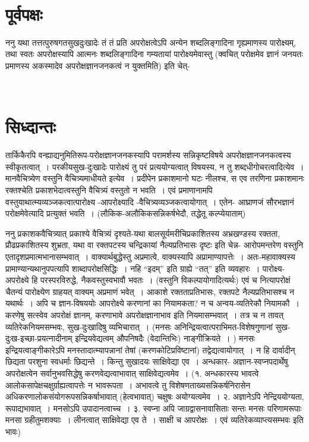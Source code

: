 {~\\[-1.7cm]

\section*{पूर्वपक्षः}
\vskip -3pt

ननु  यथा तत्तत्पुरुषगतसुखदुःखादेः तं तं प्रति अपरोक्षत्वेऽपि अन्येन शब्दलिङ्गादिना गृह्यमाणस्य पारोक्ष्यम्, तथा स्वतः अपरोक्षस्यापि आत्मनः शब्दलिङ्गादिना गम्यतायां पारोक्ष्यमेवास्तु (क्वचित् परोक्षमेव ज्ञानं जनयतः प्रमाणस्य अकस्मादेव अपरोक्षज्ञानजनकत्वं न युक्तमिति) इति चेत्-

~\\[-1.7cm]

\section*{सिध्दान्तः}
तार्किकैरपि वन्ह्याद्यनुमितिरूप-परोक्षज्ञानजनकस्यापि परामर्शस्य सन्निकृष्टविषये अपरोक्षज्ञानजनकत्वस्य स्वीकृतत्वात्~। परकीयसुख-दुःखादेः पारोक्ष्यं तु परं प्रत्ययोग्यत्वात् विषयस्य, न तु शब्दधीगोचरत्वादित्येव~। मानवैचित्र्येण वस्तुनि वैचित्र्यमाधीयते इत्येव~। प्रदीपेन प्रकाशमानो घटः नीलश्च, स एव तरणिना प्रकाशमानः रक्तश्चेति प्रकाशभेदात्वस्तुनि वैचित्र्यं वस्तुतो न भवति~। एवं प्रमाणानामपि वस्तुयाथात्म्यव्यञ्जकत्वा\-त्पारोक्ष्य -आपरोक्ष्यादि -वैचित्र्यव्यञ्जकत्वायोगात्~। एतेन- आघ्राणजं सौरभज्ञानं परोक्षमेवेत्यादि प्रत्युक्तं भवति~। (लौकिक-अलौकिकसन्निकर्षभेदौ, तद्धेतू कल्प्येयाताम्)

ननु प्रकाशकवैचित्र्यात् प्रकाश्ये वैचित्र्यं दृश्यते-यथा बालसूर्यमरीचिप्रकाशितस्य अभ्रखण्डस्य रक्तता, प्रौढप्रकाशितस्य शुभ्रता, यथा वा रक्तपटस्य चन्द्रिकायां नैल्यप्रतिभासः दृष्टः इति चेन्न- आरोपमन्तरेण वस्तुनि एतादृशप्रमात्मभानासम्भवात्~। वाक्यार्थबुद्धेस्तु अप्रमात्वे, वाक्यस्यापि अप्रामाण्यापत्तेः~। अतः-महावाक्यस्य प्रामाण्यान्यथानुपपत्यापि शाब्दापरोक्षसिद्धिः~। नहि “इदम्” इति ग्राह्ये “तत्” इति व्यवहारः~। पारोक्ष्य-अपरोक्ष्ये हि परस्परविरुद्धे, नैकवस्तुस्वभावौ भवतः~। (वस्तुनि विकल्पायोगादित्यर्थः) एवं च नित्यापरोक्षं चैतन्यं पारोक्ष्येण ग्राहयत् वाक्यम् अप्रमाणं भवेत्~। आकाशे रक्तताप्रतिभासः, रक्तपटे नैल्यप्रतिभासश्च न यथार्थः~। अपि च ज्ञान-विषययोः आपरोक्ष्ये करणानां का नियामकता? न च अन्वय-व्यतिरेकौ नियामकौ~। करणेषु सत्स्वेव अपरोक्षं ज्ञानम्, करणाभावे अपरोक्षज्ञानाभाव इति नियमासम्भवात्~। तत्र च न तावत् व्यतिरेकनियमसम्भवः, सुख-दुःखादिषु व्यभिचारात्~। (मनसः अनिन्द्रियत्वात्पराभिमत-विशेषगुणानां सुख-दुःख-इच्छा-प्रयत्नादीनाम् इन्द्रियवेद्यत्वम् औपनिषदैः (वेदान्तिभिः) नाङ्गीक्रियते~। ) मनसः इन्द्रियत्वाङ्गीकारेऽपि मनस्तादात्म्यापन्नानां तेषां (करणकोटिप्रविष्टानां) तद्वेद्यत्वायोगात्~। न हि दार्वादीन् छिद्यता परशुना स्वधर्माः छिद्यन्ते~। किन्तु सुखादयः साक्षिवेद्या एव~। अन्धकार- अज्ञान-स्वप्नपदार्थेषु  अपरोक्षत्वेन सर्वानुभवसिद्धेषु करणवेद्यत्वाभावात् साक्षिवेद्यत्वमेव~। (१. अन्धकारस्य भावत्वे आलोकसापेक्षचक्षुर्ग्राह्यत्वापत्तेः न भावरूपता~। अभावत्वे तु विशेषणताख्यसन्निकर्षनिरासेन अधिकरणालोकसंयोगरूपसन्निकर्षाभावात् (हेत्वभावात्) चक्षुषः अयोग्यत्वमेव~। २. अज्ञानेऽपि नेन्द्रिययोग्यता, रूपाद्यभावात्~। मनसोऽपि उपादानत्वाच्च~। ३. स्वप्ना अपि जाग्रद्वासनावासिताः सन्तः मनसः परिणामरूपाः मनसा ग्रहीतुमशक्याः~। लीनत्वात् साक्षिवेद्या एव ते~। साक्षी च आपरोक्षः~। एवं व्यतिरेकव्याप्त्यसम्भवः इति भावः)

}
